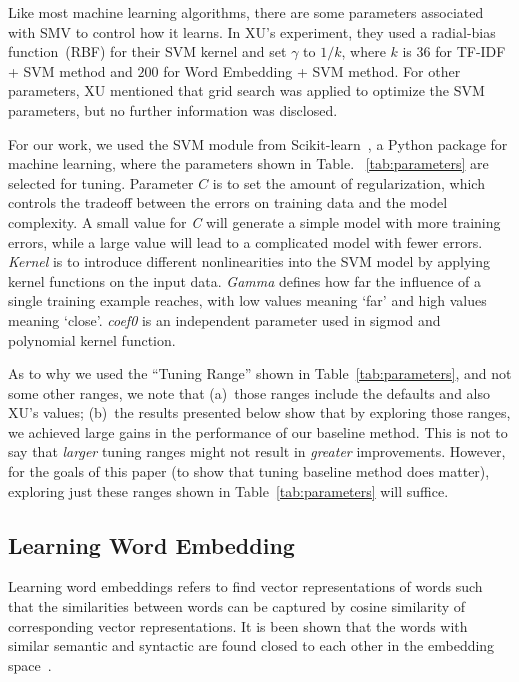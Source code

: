 \documentclass[sigconf]{acmart}
\theoremstyle{break}
\newcommand{\tab}[1]{Table~\ref{tab:#1}}
\begin{document}
Like most machine learning algorithms, there are some parameters associated with
SMV to control how it learns.  In XU's experiment, they used a radial-bias function~(RBF) for their SVM kernel
and set $\gamma$ to $1/k$, where $k$ is $36$ for TF-IDF + SVM method
and $200$ for Word Embedding + SVM method. For other parameters, 
XU mentioned that grid search was applied to optimize the SVM parameters, 
but no further information was disclosed. 

For our work, we used the SVM module from Scikit-learn~\cite{scikit-learn}, a Python package for machine learning,
where the parameters shown in Table. ~\ref{tab:parameters} are selected for tuning.
Parameter $\mathit{C}$ is to set the amount of regularization, which controls the tradeoff between
the errors on training data and the model complexity.  A small value for {\it C} will generate 
a simple model with more training errors, while a large value will lead to a complicated model with fewer
errors. {\it Kernel} is to introduce different nonlinearities into the SVM model by applying kernel functions
on the input data. {\it Gamma } defines how far the influence of a single training example reaches, 
with low values meaning `far' and high values meaning `close'. {\it coef0} is an independent parameter used
in sigmod and  polynomial kernel function.

As to why we used the ``Tuning Range'' shown in \tab{parameters}, and not some other ranges,
we note that (a)~those ranges include the defaults and also XU's values; (b)~the results presented below
show that by exploring those ranges,  we achieved large gains in the performance of our baseline method.
This is not to say that {\em larger} tuning ranges might not result in {\em greater} improvements.
However, for the goals of this paper (to show that tuning baseline method does matter), exploring
just these ranges shown in \tab{parameters} will suffice.




\subsection{Learning Word Embedding}\label{embedding}
Learning word embeddings refers to find vector representations
of words such that the similarities between words can be captured by cosine similarity of corresponding 
vector representations. It is been shown that the words with similar semantic and syntactic are found closed
to each other in the embedding space~\cite{mikolov2013distributed}.
\end{document}

